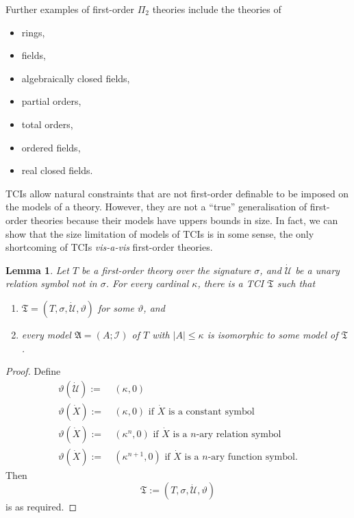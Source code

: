 \documentclass[12pt, twoside]{memoir}
\numberwithin{equation}{section}
\newtheorem{lem}[thm]{Lemma}
\theoremstyle{definition}
\theoremstyle{remark}
\theoremstyle{definition}
\theoremstyle{definition}
\theoremstyle{definition}
\theoremstyle{remark}
\begin{document}
Further examples of first-order $\Pi_2$ theories include the theories of
\begin{itemize}
    \item rings,
    \item fields,
    \item algebraically closed fields,
    \item partial orders,
    \item total orders,
    \item ordered fields,
    \item real closed fields.
\end{itemize}

TCIs allow natural constraints that are not first-order definable to be imposed on the models of a theory. However, they are not a ``true'' generalisation of first-order theories because their models have uppers bounds in size. In fact, we can show that the size limitation of models of TCIs is in some sense, the only shortcoming of TCIs \emph{vis-a-vis} first-order theories. 

\begin{lem}\label{lem511}
Let $T$ be a first-order theory over the signature $\sigma$, and $\dot{\mathcal{U}}$ be a unary relation symbol not in $\sigma$. For every cardinal $\kappa$, there is a TCI $\mathfrak{T}$ such that 
\begin{enumerate}[label=(\alph*)]
    \item $\mathfrak{T} = (T, \sigma, \dot{\mathcal{U}}, \vartheta)$ for some $\vartheta$, and
    \item every model $\mathfrak{A} = (A; \mathcal{I})$ of $T$ with $|A| \leq \kappa$ is isomorphic to some model of $\mathfrak{T}$.
\end{enumerate}
\end{lem}

\begin{proof}
Define 
\begin{align*} 
    \vartheta (\dot{\mathcal{U}}) := \ & (\kappa, 0) \\
    \vartheta (\dot{X}) := \ & (\kappa, 0) \text{ if } \dot{X} \text{ is a constant symbol} \\
    \vartheta (\dot{X}) := \ & (\kappa^n, 0)  \text{ if } \dot{X} \text{ is a } n \text{-ary relation symbol} \\
    \vartheta (\dot{X}) := \ & (\kappa^{n + 1}, 0)  \text{ if } \dot{X} \text{ is a } n \text{-ary function symbol.} 
\end{align*}
Then $$\mathfrak{T} := (T, \sigma, \dot{\mathcal{U}}, \vartheta)$$ is as required.
\end{proof}
\end{document}
